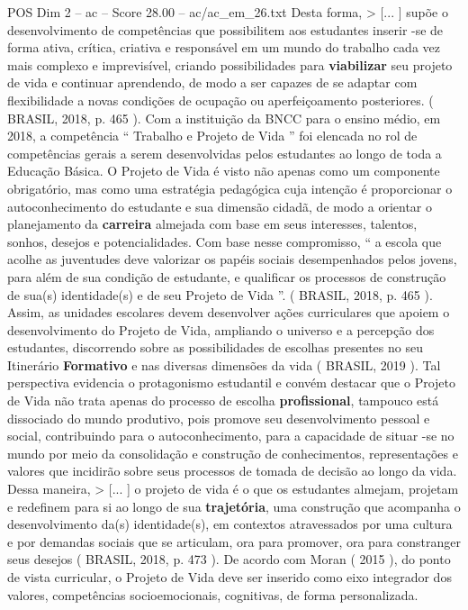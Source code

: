 \begin{textsample}{POS Dim 2 – ac – Score 28.00 – ac/ac\_em\_26.txt}
Desta forma, > [... ] supõe o desenvolvimento de competências que possibilitem aos estudantes inserir -se de forma ativa, crítica, criativa e responsável em um mundo do trabalho cada vez mais complexo e imprevisível, criando possibilidades para \textbf{viabilizar} seu projeto de vida e continuar aprendendo, de modo a ser capazes de se adaptar com flexibilidade a novas condições de ocupação ou aperfeiçoamento posteriores. ( BRASIL, 2018, p. 465 ).
Com a instituição da BNCC para o ensino médio, em 2018, a competência “ Trabalho e Projeto de Vida ” foi elencada no rol de competências gerais a serem desenvolvidas pelos estudantes ao longo de toda a Educação Básica.
O Projeto de Vida é visto não apenas como um componente obrigatório, mas como uma estratégia pedagógica cuja intenção é proporcionar o autoconhecimento do estudante e sua dimensão cidadã, de modo a orientar o planejamento da \textbf{carreira} almejada com base em seus interesses, talentos, sonhos, desejos e potencialidades.
Com base nesse compromisso, “ a escola que acolhe as juventudes deve valorizar os papéis sociais desempenhados pelos jovens, para além de sua condição de estudante, e qualificar os processos de construção de sua(s) identidade(s) e de seu Projeto de Vida ”. ( BRASIL, 2018, p. 465 ).
Assim, as unidades escolares devem desenvolver ações curriculares que apoiem o desenvolvimento do Projeto de Vida, ampliando o universo e a percepção dos estudantes, discorrendo sobre as possibilidades de escolhas presentes no seu Itinerário \textbf{Formativo} e nas diversas dimensões da vida ( BRASIL, 2019 ).
Tal perspectiva evidencia o protagonismo estudantil e convém destacar que o Projeto de Vida não trata apenas do processo de escolha \textbf{profissional}, tampouco está dissociado do mundo produtivo, pois promove seu desenvolvimento pessoal e social, contribuindo para o autoconhecimento, para a capacidade de situar -se no mundo por meio da consolidação e construção de conhecimentos, representações e valores que incidirão sobre seus processos de tomada de decisão ao longo da vida.
Dessa maneira, > [... ] o projeto de vida é o que os estudantes almejam, projetam e redefinem para si ao longo de sua \textbf{trajetória}, uma construção que acompanha o desenvolvimento da(s) identidade(s), em contextos atravessados por uma cultura e por demandas sociais que se articulam, ora para promover, ora para constranger seus desejos ( BRASIL, 2018, p. 473 ).
De acordo com Moran ( 2015 ), do ponto de vista curricular, o Projeto de Vida deve ser inserido como eixo integrador dos valores, competências socioemocionais, cognitivas, de forma personalizada.

\end{textsample}
